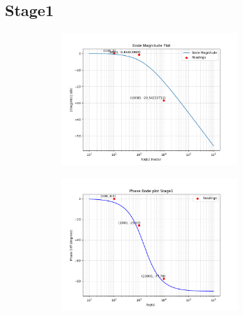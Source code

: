 \documentclass[a4paper,12pt]{article}
\begin{document}
\subsection*{Stage1}
\begin{figure}[H]
    \centering
    \begin{subfigure}{0.5\textwidth}
        \centering
        \includegraphics[height=5cm]{figs/Stage1/Magn.png}
    \end{subfigure}%
    \begin{subfigure}{0.5\textwidth}
        \centering
        \includegraphics[height=5cm]{figs/Stage1/Phase.png}
    \end{subfigure}
\end{figure}
\end{document}
